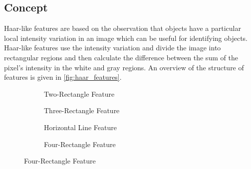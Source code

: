 \subsection{Concept}
Haar-like features \cite{viola_rapid_2004} are based on the observation that objects have a particular local intensity variation in an image which can be useful for identifying objects. Haar-like features use the intensity variation and divide the image into rectangular regions and then calculate the difference between the sum of the pixel's intensity in the white and gray regions. An overview of the structure of features is given in \ref{fig:haar_features}.
\begin{figure}[h]
    \centering
    
    \begin{subfigure}{0.45\textwidth}
        \centering
        \caption{Two-Rectangle Feature}
        \label{fig:haar_feature_1}
    \end{subfigure}
    \hfill
    \begin{subfigure}{0.45\textwidth}
        \centering
        \caption{Three-Rectangle Feature}
        \label{fig:haar_feature_2}
    \end{subfigure}
    
    \vspace{1.5em}
    
    \begin{subfigure}{0.45\textwidth}
        \centering
        \caption{Horizontal Line Feature}
        \label{fig:haar_feature_3}
    \end{subfigure}
    \hfill
    \begin{subfigure}{0.45\textwidth}
        \centering
        \caption{Four-Rectangle Feature}
        \label{fig:haar_feature_4}
    \end{subfigure}
    

\end{figure}
